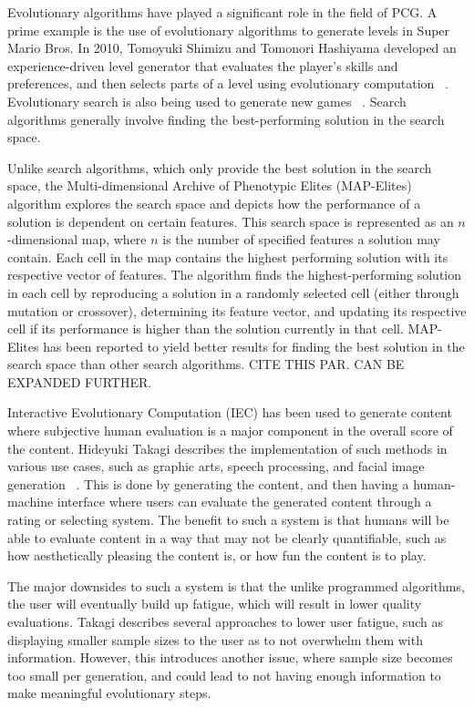 \documentclass[letterpaper, 10 pt, conference]{ieeeconf}
\begin{document}
\par
Evolutionary algorithms have played a significant role in the field of PCG. A prime example is the use of evolutionary algorithms to generate levels in Super Mario Bros. In 2010, Tomoyuki Shimizu and Tomonori Hashiyama developed an experience-driven level generator that evaluates the player's skills and preferences, and then selects parts of a level using evolutionary computation ~\cite{togelius2010level}. Evolutionary search is also being used to generate new games ~\cite{browne2010evolutionary}. Search algorithms generally involve finding the best-performing solution in the search space.
\par
Unlike search algorithms, which only provide the best solution in the search space, the Multi-dimensional Archive of Phenotypic Elites (MAP-Elites) algorithm explores the search space and depicts how the performance of a solution is dependent on certain features. This search space is represented as an $n$-dimensional map, where $n$ is the number of specified features a solution may contain. Each cell in the map contains the highest performing solution with its respective vector of features. The algorithm finds the highest-performing solution in each cell by reproducing a solution in a randomly selected cell (either through mutation or crossover), determining its feature vector, and updating its respective cell if its performance is higher than the solution currently in that cell. MAP-Elites has been reported to yield better results for finding the best solution in the search space than other search algorithms. CITE THIS PAR. CAN BE EXPANDED FURTHER.
\par
Interactive Evolutionary Computation (IEC) has been used to generate content where subjective human evaluation is a major component in the overall score of the content. Hideyuki Takagi describes the implementation of such methods in various use cases, such as graphic arts, speech processing, and facial image generation ~\cite{IEC}. This is done by generating the content, and then having a human-machine interface where users can evaluate the generated content through a rating or selecting system. The benefit to such a system is that humans will be able to evaluate content in a way that may not be clearly quantifiable, such as how aesthetically pleasing the content is, or how fun the content is to play. 
\par
The major downsides to such a system is that the unlike programmed algorithms, the user will eventually build up fatigue, which will result in lower quality evaluations. Takagi describes several approaches to lower user fatigue, such as displaying smaller sample sizes to the user as to not overwhelm them with information. However, this introduces another issue, where sample size becomes too small per generation, and could lead to not having enough information to make meaningful evolutionary steps.
\end{document}
